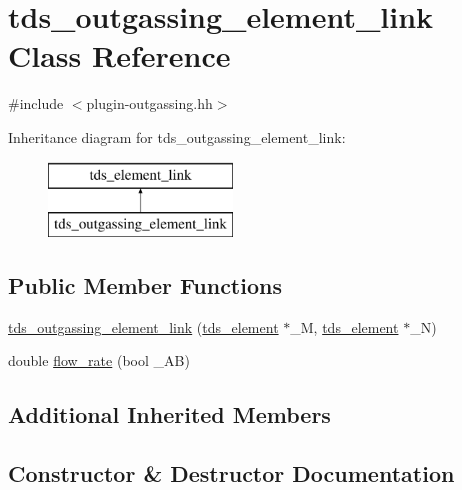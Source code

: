 \hypertarget{classtds__outgassing__element__link}{}\section{tds\+\_\+outgassing\+\_\+element\+\_\+link Class Reference}
\label{classtds__outgassing__element__link}


{\ttfamily \#include $<$plugin-\/outgassing.\+hh$>$}

Inheritance diagram for tds\+\_\+outgassing\+\_\+element\+\_\+link\+:\begin{figure}[H]
\begin{center}
\leavevmode
\includegraphics[height=2.000000cm]{classtds__outgassing__element__link}
\end{center}
\end{figure}
\subsection*{Public Member Functions}
\begin{DoxyCompactItemize}
\item 
\hyperlink{classtds__outgassing__element__link_a21b525492ecf1ef4ea45168be8c2961c}{tds\+\_\+outgassing\+\_\+element\+\_\+link} (\hyperlink{classtds__element}{tds\+\_\+element} $\ast$\+\_\+M, \hyperlink{classtds__element}{tds\+\_\+element} $\ast$\+\_\+N)
\item 
double \hyperlink{classtds__outgassing__element__link_ad288f7affc2653226877a6c99e242bb3}{flow\+\_\+rate} (bool \+\_\+\+AB)
\end{DoxyCompactItemize}
\subsection*{Additional Inherited Members}


\subsection{Constructor \& Destructor Documentation}
